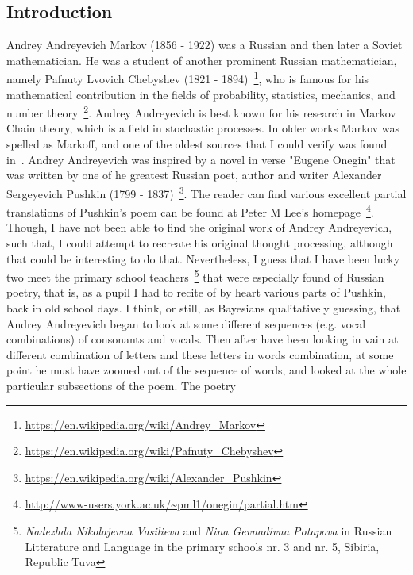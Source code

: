 \documentclass[a4paper,11pt,english]{article}
\begin{document}
		\subsection{Introduction} 


		Andrey Andreyevich Markov (1856 - 1922) was a Russian and then later a Soviet mathematician. He was a student of another prominent Russian 
		mathematician, namely Pafnuty Lvovich Chebyshev (1821 - 1894)~\footnote{\url{https://en.wikipedia.org/wiki/Andrey_Markov}}, who is famous for his 
		mathematical contribution in the fields of probability, statistics, mechanics, and number  
		theory~\footnote{\url{https://en.wikipedia.org/wiki/Pafnuty_Chebyshev}}. Andrey Andreyevich is best known for his research in Markov Chain theory, 			which is a field in stochastic processes. In older works Markov was spelled as Markoff, and one of the oldest sources that I could verify was 
		found in~\citep[p.~341]{ulam}. 
		Andrey Andreyevich was inspired by a novel in verse "Eugene Onegin" that was written by one of he greatest Russian poet, author and writer 
		Alexander Sergeyevich Pushkin (1799 - 1837)~\footnote{\url{https://en.wikipedia.org/wiki/Alexander_Pushkin}}. The reader can find various excellent 
		partial translations of Pushkin’s poem can be found at Peter M Lee's 
		homepage~\footnote{\url{http://www-users.york.ac.uk/~pml1/onegin/partial.htm}}. Though, I have not been able to find the original work of Andrey 
		Andreyevich, such that, I could attempt to recreate his original thought processing, although that could be interesting to do that. Nevertheless, I 
		guess that I have been lucky two meet the primary school teachers~\footnote{\textit{Nadezhda Nikolajevna Vasilieva} and \textit{Nina 
		Gevnadivna Potapova} in Russian Litterature and Language in the primary schools nr. 3 and nr. 5, Sibiria, Republic Tuva} that were especially found 
		of Russian poetry, that is, as a pupil I had to recite of by heart various parts of Pushkin, back in old school days. I think, or still, as 
		Bayesians qualitatively guessing, that Andrey Andreyevich began to look at some different sequences (e.g. vocal combinations) of consonants and 
		vocals. Then after have been looking in vain at different combination of letters and these letters in words 
		combination, at some point he must have zoomed out of the sequence of words, and looked at the whole particular subsections of the poem. The poetry 
\end{document}
